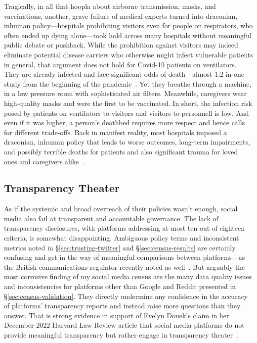 Tragically, in all that hoopla about airborne transmission, masks, and
vaccinations, another, grave failure of medical experts turned into draconian,
inhuman policy---hospitals prohibiting visitors even for people on respirators,
who often ended up dying alone---took hold across many hospitals without
meaningful public debate or pushback. While the prohibition against visitors may
indeed eliminate potential disease carriers who otherwise might infect
vulnerable patients in general, that argument does not hold for Covid-19
patients on ventilators. They are already infected and face significant odds of
death---almost 1:2 in one study from the beginning of the
pandemic~\cite{AuldCaridiScheibleea2020}. Yet they breathe through a machine, in
a low pressure room with sophisticated air filters. Meanwhile, caregivers wear
high-quality masks and were the first to be vaccinated. In short, the infection
risk posed by patients on ventilators to visitors and visitors to personnell is
low. And even if it was higher, a person's deathbed requires more respect and
hence calls for different trade-offs. Back in manifest reality, most hospitals
imposed a draconian, inhuman policy that leads to worse outcomes, long-term
impairments, and possibly terrible deaths for patients and also significant
trauma for loved ones and caregivers
alike~\cite{AndersonShawZar2020,AnnYiAzharea2021,Capozzo2020,DCouto2022,StrangBergstromea2020,WakamMontgomeryea2020}.


\subsection{Transparency Theater}
\label{sec:transparency-theater}

As if the systemic and broad overreach of their policies wasn't enough, social
media also fail at transparent and accountable governance. The lack of
transparency disclosures, with platforms addressing at most ten out of eighteen
criteria, is somewhat disappointing. Ambiguous policy terms and inconsistent
metrics noted in \S\ref{sec:trusting-twitter} and \S\ref{sec:census-results} are
certainly confusing and get in the way of meaningful comparisons between
platforms---as the British communications regulator recently noted as
well~\cite{HarlingHenesyea2023}. But arguably the most corrosive finding of my
social media census are the many data quality issues and inconsistencies for
platforms other than Google and Reddit presented in
\S\ref{sec:census-validation}. They directly undermine any confidence in the
accuracy of platforms' transparency reports and instead raise more questions
than they answer. That is strong evidence in support of Evelyn Douek's claim in
her December 2022 Harvard Law Review article that social media platforms do not
provide meaningful transparency but rather engage in transparency
theater~\cite{Douek2022}.

